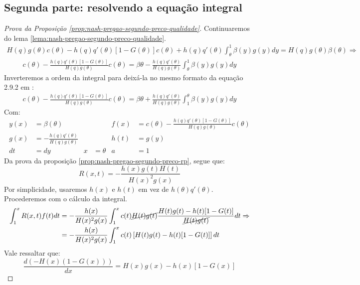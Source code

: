 \subsection{Segunda parte: resolvendo a equação integral}
\begin{proof}[Prova da Proposição \ref{prop:nash-pregao-segundo-preco-qualidade}]
	Continuaremos do lema \ref{lema:nash-pregao-segundo-preco-qualidade}.
	\begin{align*}
		H(q)g(\theta)c(\theta)-h(q)q'(\theta)[1-G(\theta)]c(\theta) + h(q)q'(\theta) \int_{\theta}^1 \beta(y)g(y)dy = H(q)g(\theta)\beta(\theta) \Rightarrow
	\end{align*}
	\begin{align*}
		c(\theta)-\frac{h(q)q'(\theta)[1-G(\theta)]}{H(q)g(\theta)}c(\theta) = \beta{\theta} - \frac{h(q)q'(\theta)}{H(q)g(\theta)} \int_{\theta}^1 \beta(y)g(y)dy 
	\end{align*}
	Inverteremos a ordem da integral para deixá-la no mesmo formato da equação 2.9.2 em \citet{polyanin1998handbook}:
	\begin{align*}
		c(\theta)-\frac{h(q)q'(\theta)[1-G(\theta)]}{H(q)g(\theta)}c(\theta) = \beta{\theta} + \frac{h(q)q'(\theta)}{H(q)g(\theta)} \int_1^{\theta} \beta(y)g(y)dy 
	\end{align*}
	Com:
	\begin{align*}
		y(x) & = \beta(\theta) & & & f(x) & = c(\theta)-\frac{h(q)q'(\theta)[1-G(\theta)]}{H(q)g(\theta)}c(\theta) \\
		g(x) & = - \frac{h(q)q'(\theta)}{H(q)g(\theta)} & & & h(t) & = g(y) \\
		dt & = dy & x & = \theta & a & = 1
	\end{align*}
	Da prova da proposição \ref{prop:nash-pregao-segundo-preco-rp}, segue que:
	\begin{equation*}
		R(x,t) = -\frac{h(x)g(t)H(t)}{H(x)^2g(x)}
	\end{equation*}
	Por simplicidade, usaremos $h(x)$ e $h(t)$ em vez de $h(\theta)q'(\theta)$. Procederemos com o cálculo da integral.
	\begin{align*}
		\int_1^x R(x,t)f(t)dt & = -\frac{h(x)}{H(x)^2g(x)} \int_1^x c(t)\cancel{H(t)g(t)} \frac{H(t)g(t)-h(t)[1-G(t)]}{\cancel{H(t)g(t)}} dt \Rightarrow \\
		& = -\frac{h(x)}{H(x)^2g(x)} \int_1^x  c(t) \left[ H(t)g(t)-h(t)[1-G(t)] \right] dt
	\end{align*}
	Vale ressaltar que:
	\begin{equation*}
		\frac{d(-H(x)(1-G(x)))}{dx} =  H(x)g(x)-h(x)[1-G(x)]

\end{equation*}
\end{proof}
